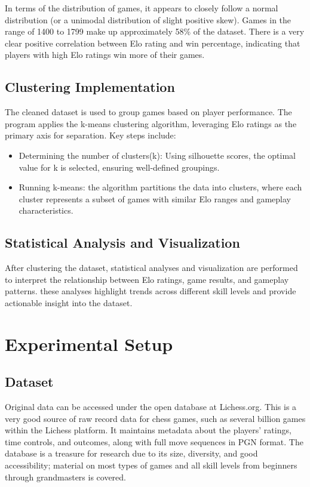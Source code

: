 \documentclass[conference]{IEEEtran}
\begin{document}
In terms of the distribution of games, it appears to closely follow a normal distribution (or a unimodal distribution of slight positive skew). Games in the range of 1400 to 1799 make up approximately 58\% of the dataset. There is a very clear positive correlation between Elo rating and win percentage, indicating that players with high Elo ratings win more of their games.

\subsection{Clustering Implementation}
 The cleaned dataset is used to group games based on player performance. The program applies the k-means clustering algorithm, leveraging Elo ratings as the primary axis for separation. Key steps include:
\begin{itemize}
    \item Determining the number of clusters(k): Using silhouette scores, the optimal value for k is selected, ensuring well-defined groupings.
    \item Running k-means: the algorithm partitions the data into clusters, where each cluster represents a subset of games with similar Elo ranges and gameplay characteristics.
\end{itemize}

\subsection{Statistical Analysis and Visualization}
After clustering the dataset, statistical analyses and visualization are performed to interpret the relationship between Elo ratings, game results, and gameplay patterns. these analyses highlight trends across different skill levels and provide actionable insight into the dataset.


\section{Experimental Setup}
\subsection{Dataset}
Original data can be accessed under the open database at Lichess.org. This is a very good source of raw record data for chess games, such as several billion games within the Lichess platform. It maintains metadata about the players' ratings, time controls, and outcomes, along with full move sequences in PGN format. The database is a treasure for research due to its size, diversity, and good accessibility; material on most types of games and all skill levels from beginners through grandmasters is covered.
\end{document}
